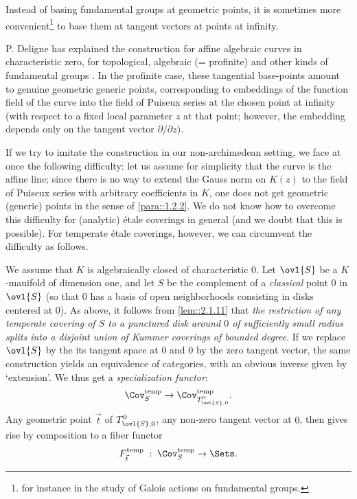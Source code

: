 \begin{para}\label{para::2.2.1} Instead of basing fundamental groups at
 geometric points, it is sometimes more convenient\footnote{for instance
 in the study of Galois actions on fundamental groups.} to base them at 
 tangent vectors at points at infinity. 

 P. Deligne has explained the construction for affine algebraic curves in 
 characteristic zero, for topological, algebraic (= profinite) and other
 kinds of fundamental groups \cite{lgfdldpmtp}. In the profinite case, these
 tangential base-points amount to genuine geometric generic points,
 corresponding to embeddings of the function field of the curve into the
 field of Puiseux series at the chosen point at infinity (with respect
 to a fixed local parameter $z$ at that point; however, the embedding
 depends only on the tangent vector $\partial/\partial z$).

 If we try to imitate the construction in our non-archimedean setting, we
 face at once the following difficulty: let us assume for simplicity
 that the curve is the affine line; since there is no way to extend the
 Gauss norm on $K(z)$ to the field of Puiseux series with arbitrary coefficients in $K$, one does not get geometric (generic) points in the sense of \ref{para::1.2.2}.  We
 do not know how to overcome this difficulty for (analytic) \'etale coverings in
 general (and we doubt that this is possible). For temperate \'etale
 coverings, however, we can circumvent the difficulty as follows.
\end{para}

\begin{para}\label{para::2.2.2} We assume that $K$ is algebraically
 closed of characteristic $0$. Let $\ovl{S}$ be a $K$-manifold of
 dimension one, and let $S$ be the complement of a {\it classical} point
 $0$ in $\ovl{S}$ (so that $0$ has a basis of open neighborhoods
 consisting in disks centered at $0$). As above, it follows from
 \ref{lem::2.1.11} 
 that {\it the restriction of any temperate covering of $S$ to a
 punctured disk around $0$ of sufficiently small radius splits into a
 disjoint union of Kummer coverings of bounded degree}. If we replace
 $\ovl{S}$ by the its tangent space at $0$ and $0$ by the zero tangent
 vector, the same construction yields an equivalence of categories, with
 an obvious inverse given by `extension'. We thus get a {\it
 specialization functor}:
 \begin{equation*}
 \Cov^{\mathrm{temp}}_S\to  \Cov^{\mathrm{temp}}_{T_{\ovl{S},0}^0}.
 \end{equation*}         
 Any geometric point $\vec t$ of $T_{\ovl{S},0}^0$, 
 \eg any non-zero tangent vector at $0$, then gives rise by composition
 to a fiber functor 
 \begin{equation*}
  F^{\mathrm{temp}}_{\vec t}\;:\; \Cov^{\mathrm{temp}}_S\to  \Sets.
 \end{equation*}         
\end{para}

